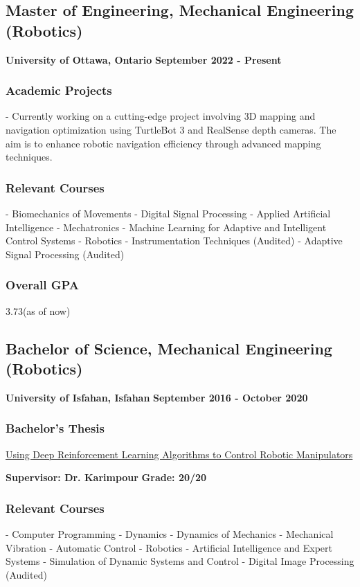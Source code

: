 \documentclass[a4paper]{article}
\begin{document}
\subsection{Master of Engineering, Mechanical Engineering (Robotics)}
{\bfseries\small University of Ottawa, Ontario}
\hfill
{\bfseries\small September 2022 - Present}
        
\subsubsection{Academic Projects}
- Currently working on a cutting-edge project involving 3D mapping and navigation optimization using TurtleBot 3 and RealSense depth cameras. The aim is to enhance robotic navigation efficiency through advanced mapping techniques.
        
\subsubsection{Relevant Courses}
- Biomechanics of Movements
- Digital Signal Processing
- Applied Artificial Intelligence
- Mechatronics
- Machine Learning for Adaptive and Intelligent Control Systems
- Robotics
- Instrumentation Techniques (Audited)
- Adaptive Signal Processing (Audited)

\subsubsection{Overall GPA}
3.73(as of now)

\subsection{Bachelor of Science, Mechanical Engineering (Robotics)}
{\bfseries\small University of Isfahan, Isfahan}
\hfill
{\bfseries\small September 2016 - October 2020}
        
\subsubsection{Bachelor's Thesis}
\href{https://github.com/ake1999/aarm}{Using Deep Reinforcement Learning Algorithms to Control Robotic Manipulators} 
        
{\bfseries\small Supervisor: Dr. Karimpour}
\hfill
{\bfseries\small Grade: 20/20}
        
\subsubsection{Relevant Courses}
- Computer Programming
- Dynamics
- Dynamics of Mechanics
- Mechanical Vibration
- Automatic Control
- Robotics
- Artificial Intelligence and Expert Systems
- Simulation of Dynamic Systems and Control
- Digital Image Processing (Audited)
        
\end{document}
